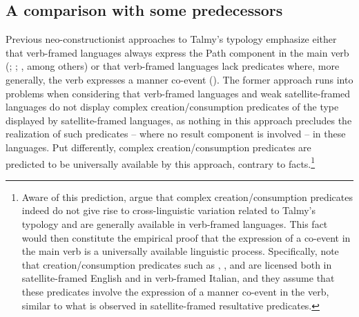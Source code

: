 \documentclass[output=paper,colorlinks,citecolor=brown]{langscibook}
\begin{document}
\subsection{A comparison with some predecessors}\label{3.3}

Previous neo-constructionist approaches to Talmy's typology emphasize either that verb-framed languages always express the Path component in the main verb (\citealt{Acedo-MatellanandMateu2013}; \citealt{Acedo-Matellan2016}; \citealt{FolliAndHarley2020}, among others) or that verb-framed languages lack predicates where, more generally, the verb expresses a manner co-event (\citealt{Mateu2012}). The former approach runs into problems when considering that verb-framed languages and weak satel\-lite-framed languages do not display complex creation/consumption predicates of the type displayed by satellite-framed languages, as nothing in this approach precludes the realization of such predicates -- where no result component is involved -- in these languages. Put differently, complex creation/consumption predicates are predicted to be universally available by this approach, contrary to facts.\footnote{Aware of this prediction, \citet{FolliAndHarley2020} argue that complex creation/consumption predicates indeed do not give rise to cross-linguistic variation related to Talmy's typology and are generally available in verb-framed languages. This fact would then constitute the empirical proof that the expression of a co-event in the main verb is a universally available linguistic process. Specifically, \citet{FolliAndHarley2020} note that creation/consumption predicates such as , , and  are licensed both in satellite-framed English and in verb-framed Italian, and they assume that these predicates involve the expression of a manner co-event in the verb, similar to what is observed in satellite-framed resultative predicates. %
}
\end{document}
